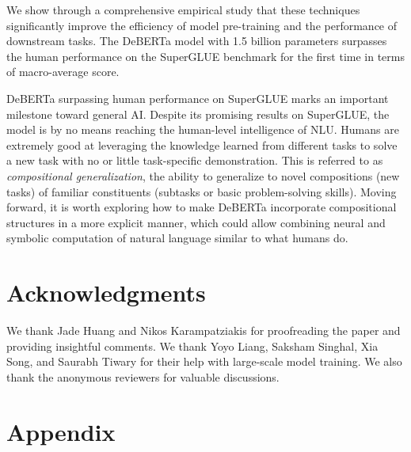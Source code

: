 \documentclass{article}
\begin{document}
We show through a comprehensive empirical study that these techniques significantly improve the efficiency of model pre-training and the performance of downstream tasks. 
The DeBERTa model with 1.5 billion parameters surpasses the human
performance on the SuperGLUE benchmark for the first time
in terms of macro-average score.

DeBERTa surpassing human performance on SuperGLUE marks an important milestone toward general AI. Despite its promising results on SuperGLUE, the model is by no means reaching the human-level intelligence of NLU. Humans are extremely good at leveraging the knowledge learned from different tasks to solve a new task with no or little task-specific demonstration. This is referred to as \emph{compositional generalization}, the ability to generalize to novel compositions (new tasks) of familiar constituents (subtasks or basic problem-solving skills). Moving forward, it is worth exploring how to make DeBERTa incorporate compositional structures in a more explicit manner, which could allow combining neural and symbolic computation of natural language similar to what humans do.






%
 






 \section{Acknowledgments}


We thank Jade Huang and Nikos Karampatziakis for proofreading the paper and providing insightful comments. We thank Yoyo Liang, Saksham Singhal, Xia Song, and Saurabh Tiwary for their help with large-scale model training. 
We also thank the anonymous reviewers for valuable discussions.  



 


\clearpage
\appendix
\section{Appendix}
\label{sec:appendix}
\end{document}
